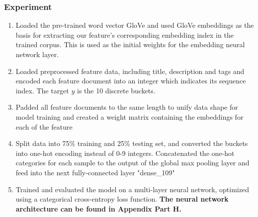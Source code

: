 \documentclass[english]{article}
\begin{document}
\subsubsection{Experiment}
\begin{enumerate}
    \item Loaded the pre-trained word vector GloVe and used GloVe embeddings as the basis for extracting our feature's corresponding embedding index in the trained corpus. This is used as the initial weights for the embedding neural network layer. 
    \item Loaded preprocessed feature data, including title, description and tags and encoded each feature document into an integer which indicates its sequence index. The target $y$ is the 10 discrete buckets.
    \item Padded all feature documents to the same length to unify data shape for model training and created a weight matrix containing the embeddings for each of the feature 
    \item Split data into 75\% training and 25\% testing set, and converted the buckets into one-hot encoding instead of 0-9 integers. Concatenated the one-hot categories for each sample to the output of the global max pooling layer and feed into the next fully-connected layer "dense\_109"
    \item Trained and evaluated the model on a multi-layer neural network, optimized using a categorical cross-entropy loss function. \textbf{The neural network architecture can be found in Appendix Part H.}
    
    

\end{enumerate}
\end{document}
